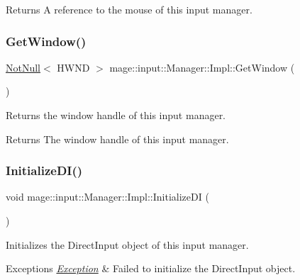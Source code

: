 \begin{DoxyReturn}{Returns}
A reference to the mouse of this input manager. 
\end{DoxyReturn}
\hypertarget{classmage_1_1input_1_1_manager_1_1_impl_a79b6d5d2d8290f3b3a40a7ee522de2bf}{}\label{classmage_1_1input_1_1_manager_1_1_impl_a79b6d5d2d8290f3b3a40a7ee522de2bf} 
\subsubsection{\texorpdfstring{Get\+Window()}{GetWindow()}}
{\footnotesize\ttfamily \hyperlink{namespacemage_a8769f9d670d6b585ea306cb1062af94b}{Not\+Null}$<$ H\+W\+ND $>$ mage\+::input\+::\+Manager\+::\+Impl\+::\+Get\+Window (\begin{DoxyParamCaption}{ }\end{DoxyParamCaption})\hspace{0.3cm}{\ttfamily [noexcept]}}

Returns the window handle of this input manager.

\begin{DoxyReturn}{Returns}
The window handle of this input manager. 
\end{DoxyReturn}
\hypertarget{classmage_1_1input_1_1_manager_1_1_impl_a407de000dcb4df8fa32a09e246150daf}{}\label{classmage_1_1input_1_1_manager_1_1_impl_a407de000dcb4df8fa32a09e246150daf} 
\subsubsection{\texorpdfstring{Initialize\+D\+I()}{InitializeDI()}}
{\footnotesize\ttfamily void mage\+::input\+::\+Manager\+::\+Impl\+::\+Initialize\+DI (\begin{DoxyParamCaption}{ }\end{DoxyParamCaption})\hspace{0.3cm}{\ttfamily [private]}}

Initializes the Direct\+Input object of this input manager.


\begin{DoxyExceptions}{Exceptions}
{\em \hyperlink{classmage_1_1_exception}{Exception}} & Failed to initialize the Direct\+Input object. \\
\hline
\end{DoxyExceptions}
\hypertarget{classmage_1_1input_1_1_manager_1_1_impl_af97f784f50a39c43ed41abe207a8f61e}{}\label{classmage_1_1input_1_1_manager_1_1_impl_af97f784f50a39c43ed41abe207a8f61e} 
